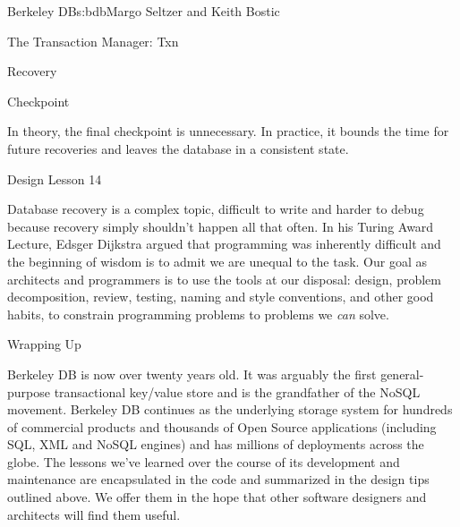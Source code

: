\begin{aosachapter}{Berkeley DB}{s:bdb}{Margo Seltzer and Keith Bostic}
\begin{aosasect1}{The Transaction Manager: Txn}
\begin{aosasect2}{Recovery}
\begin{aosaenumerate}
  \item Checkpoint

\end{aosaenumerate}

\vspace{-0.2cm}

In theory, the final checkpoint is unnecessary. In practice, it bounds
the time for future recoveries and leaves the database in a consistent
state. 

\begin{aosabox}{Design Lesson 14}

Database recovery is a complex topic, difficult to write and harder to
debug because recovery simply shouldn't happen all that often. In his
Turing Award Lecture, Edsger Dijkstra argued that programming was
inherently difficult and the beginning of wisdom is to admit we are
unequal to the task. Our goal as architects and programmers is to use
the tools at our disposal: design, problem decomposition, review,
testing, naming and style conventions, and other good habits, to
constrain programming problems to problems we \emph{can} solve.

\end{aosabox}

\end{aosasect2}

\end{aosasect1}
\newpage
\begin{aosasect1}{Wrapping Up}

Berkeley DB is now over twenty years old. It was arguably the first
general-purpose transactional key/value store and is the grandfather
of the NoSQL movement. Berkeley DB continues as the underlying storage
system for hundreds of commercial products and thousands of Open
Source applications (including SQL, XML and NoSQL engines) and has
millions of deployments across the globe. The lessons we've learned
over the course of its development and maintenance are encapsulated in
the code and summarized in the design tips outlined above. We offer
them in the hope that other software designers and architects will
find them useful.

\end{aosasect1}

\end{aosachapter}
